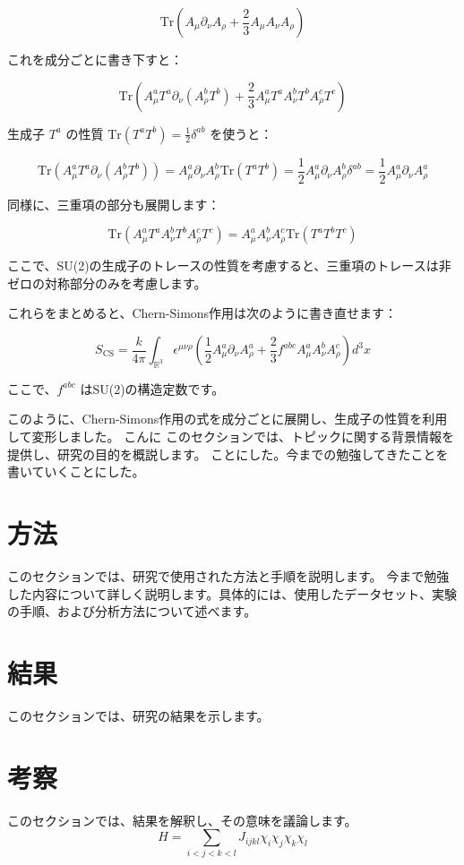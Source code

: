 \documentclass[a4paper,12pt]{article}
\begin{document}
\[
\text{Tr} \left( A_\mu \partial_\nu A_\rho + \frac{2}{3} A_\mu A_\nu A_\rho \right)
\]

これを成分ごとに書き下すと：

\[
\text{Tr} \left( A_\mu^a T^a \partial_\nu (A_\rho^b T^b) + \frac{2}{3} A_\mu^a T^a A_\nu^b T^b A_\rho^c T^c \right)
\]

生成子 $ T^a $ の性質 $ \text{Tr}(T^a T^b) = \frac{1}{2}\delta^{ab} $ を使うと：

\[
\text{Tr} \left( A_\mu^a T^a \partial_\nu (A_\rho^b T^b) \right) = A_\mu^a \partial_\nu A_\rho^b \text{Tr}(T^a T^b) = \frac{1}{2} A_\mu^a \partial_\nu A_\rho^b \delta^{ab} = \frac{1}{2} A_\mu^a \partial_\nu A_\rho^a
\]

同様に、三重項の部分も展開します：

\[
\text{Tr} \left( A_\mu^a T^a A_\nu^b T^b A_\rho^c T^c \right) = A_\mu^a A_\nu^b A_\rho^c \text{Tr}(T^a T^b T^c)
\]

ここで、SU(2)の生成子のトレースの性質を考慮すると、三重項のトレースは非ゼロの対称部分のみを考慮します。

これらをまとめると、Chern-Simons作用は次のように書き直せます：

\[
S_{\mathrm{CS}} = \frac{k}{4\pi} \int_{\mathbb{R}^3} \epsilon^{\mu\nu\rho} \left( \frac{1}{2} A_\mu^a \partial_\nu A_\rho^a + \frac{2}{3} f^{abc} A_\mu^a A_\nu^b A_\rho^c \right) d^3x
\]

ここで、$ f^{abc} $ はSU(2)の構造定数です。

このように、Chern-Simons作用の式を成分ごとに展開し、生成子の性質を利用して変形しました。
こんに
このセクションでは、トピックに関する背景情報を提供し、研究の目的を概説します。
ことにした。今までの勉強してきたことを書いていくことにした。
\section{方法}
このセクションでは、研究で使用された方法と手順を説明します。
今まで勉強した内容について詳しく説明します。具体的には、使用したデータセット、実験の手順、および分析方法について述べます。
\section{結果}
このセクションでは、研究の結果を示します。
\section{考察}
このセクションでは、結果を解釈し、その意味を議論します。
\begin{equation}
H = \sum_{i < j < k < l} J_{ijkl} \chi_i \chi_j \chi_k \chi_l
\end{equation}
\end{document}
